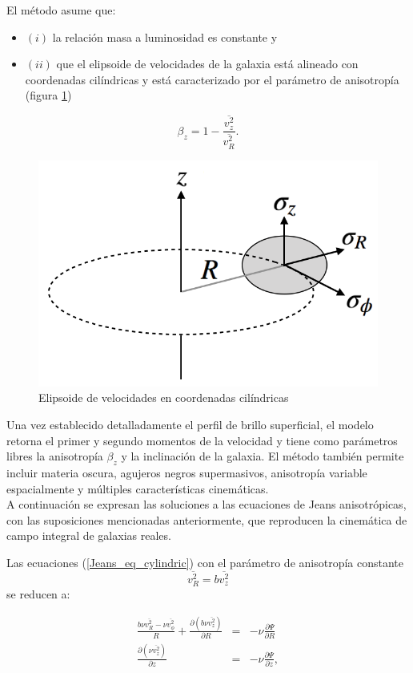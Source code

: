 El método asume que:
\begin{itemize}
\item $(i)$ la relación masa a luminosidad es constante y 
\item $(ii)$  que el elipsoide de velocidades de la galaxia está alineado con coordenadas cilíndricas y está caracterizado por el parámetro de anisotropía (figura \ref{fig:Ellipsoid})
\end{itemize}
$$ \beta_z = 1-\frac{\overline{v_z^2}}{ \overline{v_R^2} }. $$

\begin{figure}
  \centering
    \includegraphics[width=0.8\columnwidth]{Kap2/ellipsoid.png}
  \caption{Elipsoide de velocidades en coordenadas cilíndricas}
  \label{fig:Ellipsoid}
\end{figure}


Una vez establecido detalladamente el perfil de brillo superficial, el modelo retorna el primer y segundo momentos de la velocidad y tiene como parámetros libres la anisotropía $\beta_z$ y la inclinación de la galaxia. El método también permite incluir materia oscura, agujeros negros supermasivos, anisotropía variable espacialmente y múltiples características cinemáticas.\\

A continuación se expresan las soluciones a las ecuaciones de Jeans anisotrópicas, con las suposiciones mencionadas anteriormente, que reproducen la cinemática de campo integral de galaxias reales.


Las ecuaciones (\ref{Jeans_eq_cylindric}) con el parámetro de anisotropía constante 
$$ \overline{v_R^2} = b\overline{v_z^2} $$
se reducen a:

\begin{eqnarray}
\frac{ b \nu \overline{v_R^2} - \nu \overline{v_{\phi}^2} }{R } + \frac{\partial (b \nu \overline{v_z^2})}{\partial R}  &=& -\nu \frac{\partial \Psi}{\partial R} \\
\frac{\partial (\nu \overline{v_z^2})}{\partial z}  &=& -\nu \frac{\partial \Psi}{\partial z},
\end{eqnarray}

